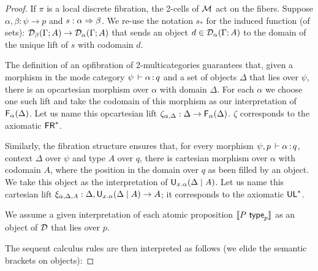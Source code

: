 \begin{proof}
If $\pi$ is a local discrete fibration, the 2-cells of $\mathcal{M}$ act on the
fibers. Suppose $\alpha, \beta : \psi \to p$ and $s : \alpha \Rightarrow
\beta$. We re-use the notation $s_*$ for the induced function (of sets):
$\mathcal{D}_\beta(\Gamma; A) \to \mathcal{D}_\alpha(\Gamma; A)$ that sends an object $d \in \mathcal{D}_\alpha(\Gamma; A)$ to the domain of the unique lift of $s$ with codomain $d$.

The definition of an opfibration of 2-multicategories guarantees that,
given a morphism in the mode category $\psi \, \vdash \alpha \, \mathit{:} \, q$ and a set of objects $\Delta$ that lies over $\psi$, there is an
opcartesian morphism over $\alpha$ with domain $\Delta$. For each
$\alpha$ we choose one such lift and take the codomain of this morphism
as our interpretation of $\mathsf{F}_{\alpha}(\Delta)$. Let us name this
opcartesian lift $\zeta_{\alpha, \Delta} : \Delta \to
\mathsf{F}_{\alpha}(\Delta)$. $\zeta$ corresponds to the axiomatic $\mathsf{FR}^*$.

Similarly, the fibration structure ensures that, for every morphism $\psi, p \, \vdash \alpha \, \mathit{:} \, q$, context $\Delta$ over $\psi$ and type $A$ over
$q$, there is cartesian morphism over $\alpha$ with codomain $A$, where the
position in the domain over $q$ as been filled by an object. We take this object as the interpretation of
$\mathsf{U}_{x.\alpha}(\Delta \mid A)$.  Let us name this cartesian lift
$\xi_{\alpha, \Delta,A} : \Delta,\mathsf{U}_{x.\alpha}(\Delta \mid A) \to A$; it
corresponds to the axiomatic $\mathsf{UL}^*$.  

We assume a given interpretation of each atomic proposition $\llbracket
P \,\, \mathsf{type}_{p} \rrbracket$ as an object of $\mathcal{D}$ that lies over $p$.

The sequent calculus rules are then interpreted as follows (we elide the
semantic brackets on objects):


\end{proof}
